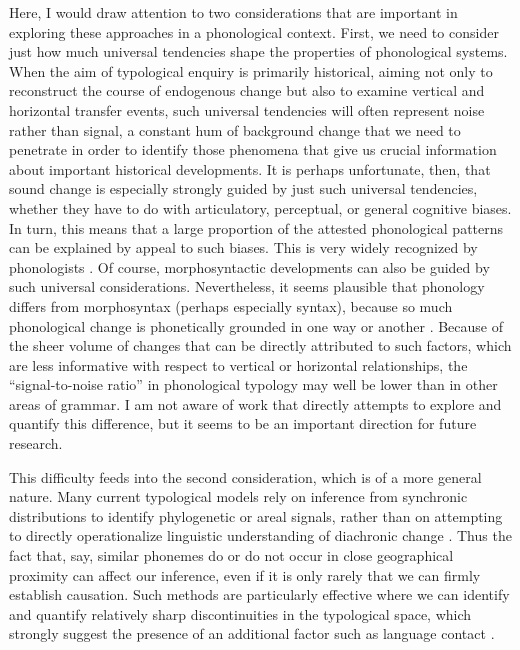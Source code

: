 \documentclass[output=paper,colorlinks,citecolor=brown]{langscibook}
\begin{document}
Here, I would draw attention to two considerations that are important in exploring these approaches in a phonological context. First, we need to consider just how much universal tendencies shape the properties of phonological systems. When the aim of typological enquiry is primarily historical, aiming not only to reconstruct the course of endogenous change but also to examine vertical and horizontal transfer events, such universal tendencies will often represent noise rather than signal, a constant hum of background change that we need to penetrate in order to identify those phenomena that give us crucial information about important historical developments. It is perhaps unfortunate, then, that sound change is especially strongly guided by just such universal tendencies, whether they have to do with articulatory, perceptual, or general cognitive biases. In turn, this means that a large proportion of the attested phonological patterns can be explained by appeal to such biases. This is very widely recognized by phonologists \parencite[cf.][]{blevins, hansson2008diachronic, gordon2016phonological}. Of course, morphosyntactic developments can also be guided by such universal considerations. Nevertheless, it seems plausible that phonology differs from morphosyntax (perhaps especially syntax), because so much phonological change is phonetically grounded in one way or another \parencite[cf.][]{Garrett_2013}. Because of the sheer volume of changes that can be directly attributed to such factors, which are less informative with respect to vertical or horizontal relationships, the \enquote{signal\hyp to\hyp noise ratio} in phonological typology may well be lower than in other areas of grammar. I am not aware of work that directly attempts to explore and quantify this difference, but it seems to be an important direction for future research.

This difficulty feeds into the second consideration, which is of a more general nature. Many current typological models rely on inference from synchronic distributions to identify phylogenetic or areal signals, rather than on attempting to directly operationalize linguistic understanding of diachronic change \parencite[for an example from phonology, see][]{dockum2018phylogeny}. Thus the fact that, say, similar phonemes do or do not occur in close geographical proximity can affect our inference, even if it is only rarely that we can firmly establish causation. Such methods are particularly effective where we can identify and quantify relatively sharp discontinuities in the typological space, which strongly suggest the presence of an additional factor such as language contact \parencite{Nikolaev2019}.
\end{document}
